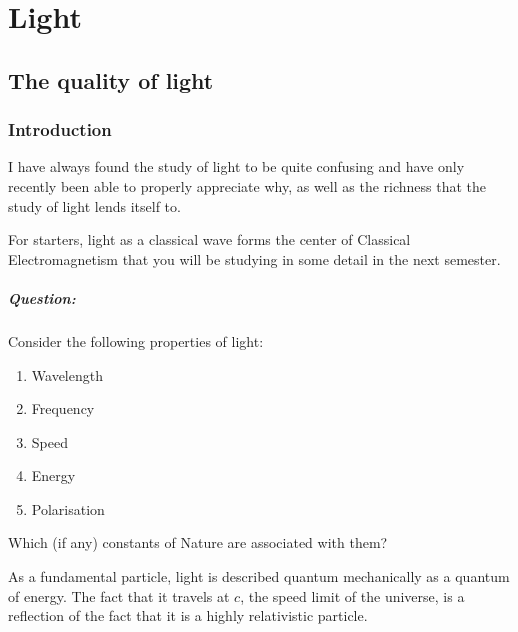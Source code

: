 
\chapter{Light}

\section{The quality of light}

\subsection{Introduction}

\vspace{0.5cm}

I have always found the study of light to be quite confusing and have only recently been able to properly appreciate why, as well as the richness that the study of light lends itself to. 

For starters, light as a classical wave forms the center of Classical Electromagnetism that you will be studying in some detail in the next semester. 


\begin{tcolorbox}
\paragraph{Question: }Consider the following properties of light:

\begin{enumerate}
\item Wavelength
\item Frequency
\item Speed
\item Energy
\item Polarisation
\end{enumerate}

Which (if any) constants of Nature are associated with them?
\end{tcolorbox}

\vspace{0.5cm}

As a fundamental particle, light is described quantum mechanically as a quantum of energy. The fact that it travels at $c$, the speed limit of the universe, is a reflection of the fact that it is a highly relativistic particle.


